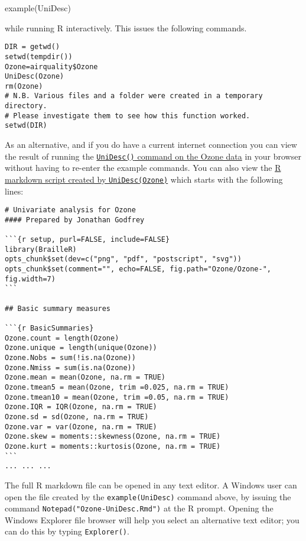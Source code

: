 \documentclass[
]{book}
\newenvironment{Shaded}{\begin{snugshade}}{\end{snugshade}}
\newcommand{\FunctionTok}[1]{\textcolor[rgb]{0.00,0.00,0.00}{#1}}
\newcommand{\NormalTok}[1]{#1}
\begin{document}
\begin{Shaded}
\begin{Highlighting}[]
\FunctionTok{example}\NormalTok{(UniDesc)}
\end{Highlighting}
\end{Shaded}

while running R interactively. This issues the following commands.

\begin{verbatim}
DIR = getwd()
setwd(tempdir())
Ozone=airquality$Ozone
UniDesc(Ozone)
rm(Ozone)
# N.B. Various files and a folder were created in a temporary directory. 
# Please investigate them to see how this function worked.
setwd(DIR)
\end{verbatim}

As an alternative, and if you do have a current internet connection you can view the result of running the \href{https://R-Resources.massey.ac.nz/BrailleRInAction/Ozone-UniDesc.html}{\texttt{UniDesc()} command on the Ozone data} in your browser without having to re-enter the example commands. You can also view the \href{Ozone-UniDesc.Rmd}{R markdown script created by \texttt{UniDesc(Ozone)}} which starts with the following lines:

\begin{verbatim}
# Univariate analysis for Ozone 
#### Prepared by Jonathan Godfrey   

```{r setup, purl=FALSE, include=FALSE}
library(BrailleR)
opts_chunk$set(dev=c("png", "pdf", "postscript", "svg"))
opts_chunk$set(comment="", echo=FALSE, fig.path="Ozone/Ozone-", fig.width=7)
```  

## Basic summary measures

```{r BasicSummaries}
Ozone.count = length(Ozone)
Ozone.unique = length(unique(Ozone))
Ozone.Nobs = sum(!is.na(Ozone))
Ozone.Nmiss = sum(is.na(Ozone))
Ozone.mean = mean(Ozone, na.rm = TRUE)
Ozone.tmean5 = mean(Ozone, trim =0.025, na.rm = TRUE)
Ozone.tmean10 = mean(Ozone, trim =0.05, na.rm = TRUE)
Ozone.IQR = IQR(Ozone, na.rm = TRUE)
Ozone.sd = sd(Ozone, na.rm = TRUE)
Ozone.var = var(Ozone, na.rm = TRUE)
Ozone.skew = moments::skewness(Ozone, na.rm = TRUE)
Ozone.kurt = moments::kurtosis(Ozone, na.rm = TRUE)
``` 
... ... ...
\end{verbatim}

The full R markdown file can be opened in any text editor. A Windows user can open the file created by the \texttt{example(UniDesc)} command above, by issuing the command \texttt{Notepad("Ozone-UniDesc.Rmd")} at the R prompt. Opening the Windows Explorer file browser will help you select an alternative text editor; you can do this by typing \texttt{Explorer()}.
\end{document}
